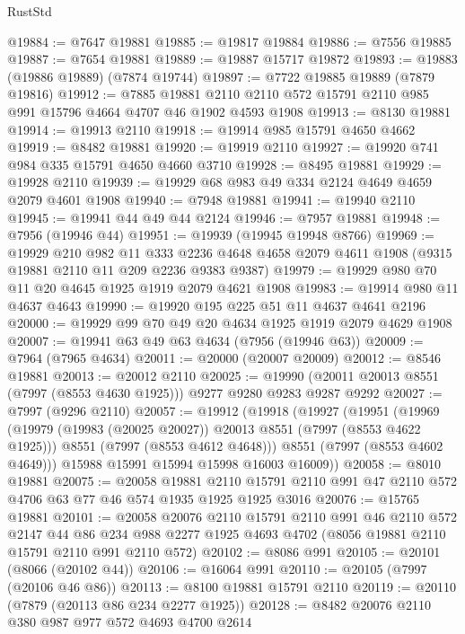 \begin{lexlean}{RustStd}
\begin{coremodule}
{\begin{coremodule}
{{{{{{{{{{{{{{{{{{{{{{{{{{{{{{{{{{{{{{{{{{{@19884 := @7647 @19881
@19885 := @19817 @19884
@19886 := @7556 @19885
@19887 := @7654 @19881
@19889 := @19887 @15717 @19872
@19893 := @19883 (@19886 @19889) (@7874 @19744)
@19897 := @7722 @19885 @19889 (@7879 @19816)
@19912 := @7885
    @19881
    @2110
    @2110
    @572
    @15791
    @2110
    @985
    @991
    @15796
    @4664
    @4707
    @46
    @1902
    @4593
    @1908
@19913 := @8130 @19881
@19914 := @19913 @2110
@19918 := @19914 @985 @15791 @4650 @4662
@19919 := @8482 @19881
@19920 := @19919 @2110
@19927 := @19920 @741 @984 @335 @15791 @4650 @4660 @3710
@19928 := @8495 @19881
@19929 := @19928 @2110
@19939 := @19929 @68 @983 @49 @334 @2124 @4649 @4659 @2079 @4601 @1908
@19940 := @7948 @19881
@19941 := @19940 @2110
@19945 := @19941 @44 @49 @44 @2124
@19946 := @7957 @19881
@19948 := @7956 (@19946 @44)
@19951 := @19939 (@19945 @19948 @8766)
@19969 := @19929
    @210
    @982
    @11
    @333
    @2236
    @4648
    @4658
    @2079
    @4611
    @1908
    (@9315 @19881 @2110 @11 @209 @2236 @9383 @9387)
@19979 := @19929 @980 @70 @11 @20 @4645 @1925 @1919 @2079 @4621 @1908
@19983 := @19914 @980 @11 @4637 @4643
@19990 := @19920 @195 @225 @51 @11 @4637 @4641 @2196
@20000 := @19929 @99 @70 @49 @20 @4634 @1925 @1919 @2079 @4629 @1908
@20007 := @19941 @63 @49 @63 @4634 (@7956 (@19946 @63))
@20009 := @7964 (@7965 @4634)
@20011 := @20000 (@20007 @20009)
@20012 := @8546 @19881
@20013 := @20012 @2110
@20025 := @19990 (@20011 @20013 @8551 (@7997 (@8553 @4630 @1925))) @9277 @9280 @9283 @9287 @9292
@20027 := @7997 (@9296 @2110)
@20057 := @19912
    (@19918
      (@19927
        (@19951
          (@19969
            (@19979 (@19983 (@20025 @20027)) @20013 @8551 (@7997 (@8553 @4622 @1925)))
            @8551
            (@7997 (@8553 @4612 @4648)))
          @8551
          (@7997 (@8553 @4602 @4649)))
        @15988
        @15991
        @15994
        @15998
        @16003
        @16009))
@20058 := @8010 @19881
@20075 := @20058
    @19881
    @2110
    @15791
    @2110
    @991
    @47
    @2110
    @572
    @4706
    @63
    @77
    @46
    @574
    @1935
    @1925
    @1925
    @3016
@20076 := @15765 @19881
@20101 := @20058
    @20076
    @2110
    @15791
    @2110
    @991
    @46
    @2110
    @572
    @2147
    @44
    @86
    @234
    @988
    @2277
    @1925
    @4693
    @4702
    (@8056 @19881 @2110 @15791 @2110 @991 @2110 @572)
@20102 := @8086 @991
@20105 := @20101 (@8066 (@20102 @44))
@20106 := @16064 @991
@20110 := @20105 (@7997 (@20106 @46 @86))
@20113 := @8100 @19881 @15791 @2110
@20119 := @20110 (@7879 (@20113 @86 @234 @2277 @1925))
@20128 := @8482 @20076 @2110 @380 @987 @977 @572 @4693 @4700 @2614
}}}}}}}}}}}}}}}}}}}}}}}}}}}}}}}}}}}}}}}}}}}
\end{coremodule}}
\end{coremodule}
\end{lexlean}
